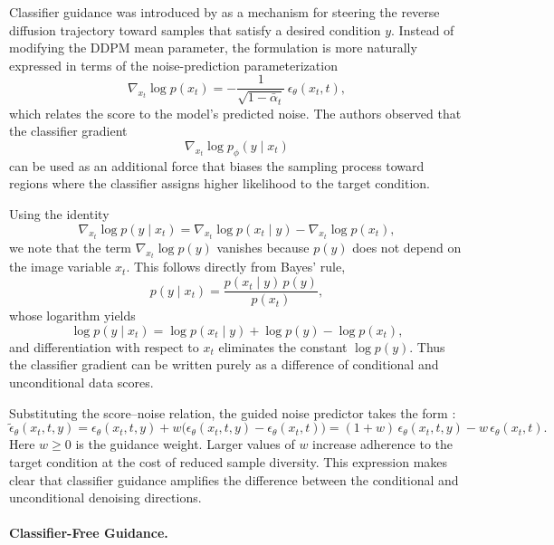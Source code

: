 Classifier guidance was introduced by \citet{NEURIPS2021_49ad23d1} as a mechanism for steering the
reverse diffusion trajectory toward samples that satisfy a desired condition $y$.  Instead of
modifying the DDPM mean parameter, the formulation is more naturally expressed in terms of the
noise-prediction parameterization
\[
\nabla_{x_t} \log p(x_t)
=
-\frac{1}{\sqrt{1-\bar\alpha_t}}\,\epsilon_\theta(x_t,t),
\]
which relates the score to the model’s predicted noise. 
The authors observed that the classifier gradient
\[
\nabla_{x_t} \log p_\phi(y \mid x_t)
\]
can be used as an additional force that biases the sampling process toward regions where the 
classifier assigns higher likelihood to the target condition.

Using the identity
\[
\nabla_{x_t}\log p(y \mid x_t)
=
\nabla_{x_t}\log p(x_t \mid y)
-
\nabla_{x_t}\log p(x_t),
\]
we note that the term $\nabla_{x_t}\log p(y)$ vanishes because $p(y)$ does not depend on the image 
variable $x_t$.  
This follows directly from Bayes’ rule,
\[
p(y \mid x_t) = \frac{p(x_t \mid y)\,p(y)}{p(x_t)},
\]
whose logarithm yields 
\[
\log p(y \mid x_t)
=
\log p(x_t \mid y)
+
\log p(y)
-
\log p(x_t),
\]
and differentiation with respect to $x_t$ eliminates the constant $\log p(y)$.
Thus the classifier gradient can be written purely as a difference of conditional and 
unconditional data scores.

Substituting the score--noise relation, the guided noise predictor takes the form \citep{NEURIPS2021_49ad23d1, weng2021diffusion}:
\begin{equation}
\tilde{\epsilon}_\theta(x_t,t,y)
=
\epsilon_\theta(x_t,t,y)
+
w\bigl(\epsilon_\theta(x_t,t,y) - \epsilon_\theta(x_t,t)\bigr)
=
(1+w)\,\epsilon_\theta(x_t,t,y)
-
w\,\epsilon_\theta(x_t,t).
\label{eq:guided_eps_classifier}
\end{equation}
Here $w \ge 0$ is the guidance weight.  
Larger values of $w$ increase adherence to the target condition at the cost of reduced sample
diversity.  
This expression makes clear that classifier guidance amplifies the difference between the
conditional and unconditional denoising directions.

\paragraph{Classifier-Free Guidance.}

